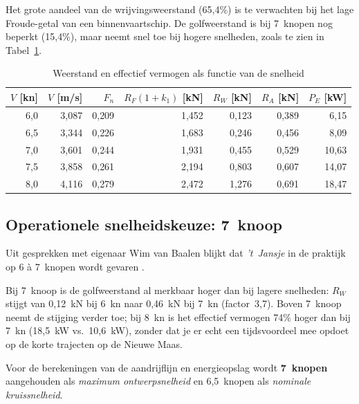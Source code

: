 Het grote aandeel van de wrijvingsweerstand (65{,}4\%) is te verwachten bij het lage
Froude-getal van een binnenvaartschip. De golfweerstand is bij 7~knopen nog beperkt
(15{,}4\%), maar neemt snel toe bij hogere snelheden, zoals te zien in
Tabel~\ref{tab:holtrop_speed_series}.

\begin{table}[H]
\centering
\caption{Weerstand en effectief vermogen als functie van de snelheid
         \cite{spreadsheet_holtrop}}
\label{tab:holtrop_speed_series}
\begin{tabular}{rrrrrrr}
\toprule
$V$ [kn] & $V$ [m/s] & $F_n$ & $R_F(1{+}k_1)$ [kN] & $R_W$ [kN] & $R_A$ [kN]
         & $P_E$ [kW] \\
\midrule
6{,}0 & 3{,}087 & 0{,}209 & 1{,}452 & 0{,}123 & 0{,}389 &  6{,}15 \\
6{,}5 & 3{,}344 & 0{,}226 & 1{,}683 & 0{,}246 & 0{,}456 &  8{,}09 \\
\rowcolor{green!15}
7{,}0 & 3{,}601 & 0{,}244 & 1{,}931 & 0{,}455 & 0{,}529 & 10{,}63 \\
7{,}5 & 3{,}858 & 0{,}261 & 2{,}194 & 0{,}803 & 0{,}607 & 14{,}07 \\
8{,}0 & 4{,}116 & 0{,}279 & 2{,}472 & 1{,}276 & 0{,}691 & 18{,}47 \\
\bottomrule
\end{tabular}
\end{table}

\subsection{Operationele snelheidskeuze: 7~knoop}
\label{subsec:snelheidskeuze}

Uit gesprekken met eigenaar Wim van Baalen blijkt dat \emph{'t~Jansje} in de
praktijk op 6 à 7~knopen wordt gevaren \cite{vanbaalen2026interview}.

Bij 7~knoop is de golfweerstand al merkbaar hoger dan bij lagere snelheden:
$R_W$ stijgt van 0{,}12~kN bij 6~kn naar 0{,}46~kN bij 7~kn (factor~3{,}7).
Boven 7~knoop neemt de stijging verder toe; bij 8~kn is het effectief vermogen
74\% hoger dan bij 7~kn (18{,}5~kW vs.\ 10{,}6~kW), zonder dat je er echt een
tijdsvoordeel mee opdoet op de korte trajecten op de Nieuwe Maas.

Voor de berekeningen van de aandrijflijn en energieopslag wordt \textbf{7~knopen}
aangehouden als \emph{maximum ontwerpsnelheid} en 6{,}5~knopen als
\emph{nominale kruissnelheid}.

